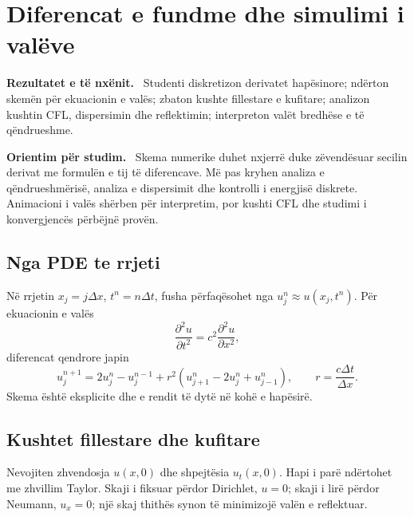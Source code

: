 \documentclass[11pt,oneside,openany]{book}
\newenvironment{qellime}{\par\medskip\noindent\textbf{Rezultatet e të nxënit.}\ }{\par\medskip}
\newenvironment{orientim}{\par\medskip\noindent\textbf{Orientim për studim.}\ }{\par\medskip}
\begin{document}




\chapter{Diferencat e fundme dhe simulimi i valëve}
\begin{qellime}
Studenti diskretizon derivatet hapësinore; ndërton skemën për ekuacionin e valës; zbaton kushte fillestare e kufitare; analizon kushtin CFL, dispersimin dhe reflektimin; interpreton valët bredhëse e të qëndrueshme.
\end{qellime}

\begin{orientim}
Skema numerike duhet nxjerrë duke zëvendësuar secilin derivat me formulën e
tij të diferencave. Më pas kryhen analiza e qëndrueshmërisë, analiza e
dispersimit dhe kontrolli i energjisë diskrete. Animacioni i valës shërben për
interpretim, por kushti CFL dhe studimi i konvergjencës përbëjnë provën.
\end{orientim}


\section{Nga PDE te rrjeti}
Në rrjetin $x_j=j\Delta x$, $t^n=n\Delta t$, fusha përfaqësohet nga $u_j^n\approx u(x_j,t^n)$. Për ekuacionin e valës
\begin{equation}
 \frac{\partial^2u}{\partial t^2}=c^2\frac{\partial^2u}{\partial x^2},
\end{equation}
diferencat qendrore japin
\begin{equation}
 u_j^{n+1}=2u_j^n-u_j^{n-1}+r^2(u_{j+1}^n-2u_j^n+u_{j-1}^n),
 \qquad r=\frac{c\Delta t}{\Delta x}.
\end{equation}
Skema është eksplicite dhe e rendit të dytë në kohë e hapësirë.

\section{Kushtet fillestare dhe kufitare}
Nevojiten zhvendosja $u(x,0)$ dhe shpejtësia $u_t(x,0)$. Hapi i parë ndërtohet me zhvillim Taylor. Skaji i fiksuar përdor Dirichlet, $u=0$; skaji i lirë përdor Neumann, $u_x=0$; një skaj thithës synon të minimizojë valën e reflektuar.
\end{document}
